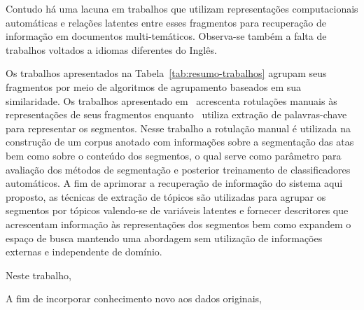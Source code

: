 Contudo há uma lacuna em trabalhos que utilizam representações computacionais automáticas e relações latentes entre esses fragmentos para recuperação de informação em documentos multi-temáticos. Observa-se também a falta de trabalhos voltados a idiomas diferentes do Inglês.

















Os trabalhos apresentados na Tabela~\ref{tab:resumo-trabalhos} agrupam seus fragmentos por meio de algoritmos de agrupamento baseados em sua similaridade. 
Os trabalhos apresentado em~\cite{Masao:2000} acrescenta rotulações manuais às representações de seus fragmentos enquanto~\cite{Cuong2011} utiliza extração de palavras-chave para representar os segmentos. 
Nesse trabalho a rotulação manual é utilizada na construção de um corpus anotado com informações sobre a segmentação das atas bem como sobre o conteúdo dos segmentos, o qual serve como parâmetro para avaliação dos métodos de segmentação e posterior treinamento de classificadores automáticos.
A fim de aprimorar a recuperação de informação do sistema aqui proposto, as técnicas de extração de tópicos são utilizadas para agrupar os segmentos por tópicos valendo-se de variáveis latentes e fornecer descritores que acrescentam informação às representações dos segmentos bem como expandem o espaço de busca mantendo uma abordagem sem utilização de informações externas e independente de domínio.


















Neste trabalho, 






A fim de incorporar conhecimento novo aos dados originais, 



















